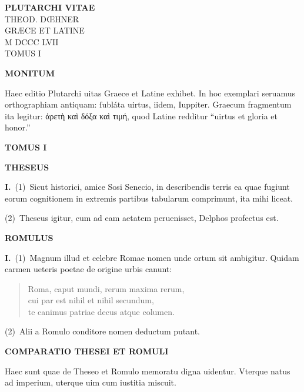\documentclass{book}
\renewcommand{\thepage}{\romannumeral\numexpr\value{page}-4\relax}
\newcommand{\heading}[1]{{\centering\bfseries\large #1\par\bigskip}}
\newcommand{\freshpage}{\clearpage\ifodd\value{page}\thispagestyle{empty}\hbox{}\clearpage\fi}
\newcommand{\beginbodynumbering}{%
  \xdef\bodyfirstpage{\number\value{page}}%
  \gdef\thepage{\the\numexpr\value{page}-\bodyfirstpage+1\relax}%
}
\begin{document}
\thispagestyle{empty}\null\clearpage
\thispagestyle{empty}\null\clearpage
\thispagestyle{empty}\null\clearpage
\thispagestyle{empty}\null\clearpage

\freshpage
\thispagestyle{empty}
\null\vfill
\begin{center}
  {\LARGE\bfseries PLUTARCHI VITAE}\\[1.5em]
  {\large THEOD. D\OE HNER}\\[1em]
  GR\AE CE ET LATINE\\[0.5em]
  M DCCC LVII\\[2em]
  TOMUS I
\end{center}
\vfill\clearpage

\freshpage
\heading{MONITUM}
Haec editio Plutarchi uitas Graece et Latine exhibet. In hoc exemplari
seruamus orthographiam antiquam: ſubláta uirtus, iidem, Iuppiter. Graecum
fragmentum ita legitur: ἀρετὴ καὶ δόξα καὶ τιμή, quod Latine
redditur ``uirtus et gloria et honor.''
\clearpage

\freshpage
\thispagestyle{empty}
\null\vfill\begin{center}{\Huge\bfseries TOMUS I}\end{center}\vfill\clearpage
\beginbodynumbering

\freshpage
\heading{THESEUS}

{\bfseries I.}~(1)~Sicut historici, amice Sosi Senecio, in describendis
terris ea quae fugiunt eorum cognitionem in extremis partibus tabularum
comprimunt, ita mihi liceat.

(2)~Theseus igitur, cum ad eam aetatem peruenisset, Delphos profectus est.

\freshpage
\heading{ROMULUS}

{\bfseries I.}~(1)~Magnum illud et celebre Romae nomen unde ortum sit
ambigitur. Quidam carmen ueteris poetae de origine urbis canunt:

\begin{verse}
Roma, caput mundi, rerum maxima rerum, \\
cui par est nihil et nihil secundum, \\
te canimus patriae decus atque columen.
\end{verse}

(2)~Alii a Romulo conditore nomen deductum putant.

\freshpage
\heading{COMPARATIO THESEI ET ROMULI}

Haec sunt quae de Theseo et Romulo memoratu digna uidentur. Vterque natus
ad imperium, uterque uim cum iustitia miscuit.

\clearpage
\thispagestyle{empty}\null\clearpage
\thispagestyle{empty}\null\clearpage
\thispagestyle{empty}\null\clearpage
\thispagestyle{empty}\null\clearpage
\end{document}
